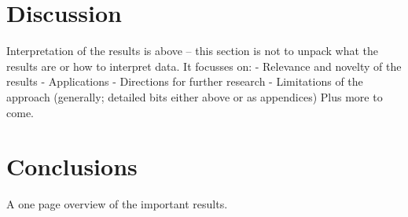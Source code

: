 \chapter{Discussion}
Interpretation of the results is above – this section is not to unpack what the results are or how to interpret data.  It focusses on:
-	Relevance and novelty of the results
-	Applications
-	Directions for further research
-	Limitations of the approach (generally; detailed bits either above or as appendices)
Plus more to come.

\chapter{Conclusions}
A one page overview of the important results.

